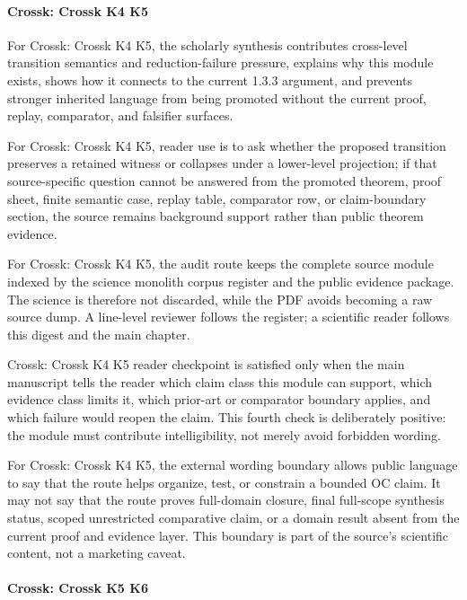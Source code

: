 \paragraph{Crossk: Crossk K4 K5}

For Crossk: Crossk K4 K5, the scholarly synthesis contributes cross-level transition semantics and reduction-failure pressure, explains why this module exists, shows how it connects to the current 1.3.3 argument, and prevents stronger inherited language from being promoted without the current proof, replay, comparator, and falsifier surfaces.


For Crossk: Crossk K4 K5, reader use is to ask whether the proposed transition preserves a retained witness or collapses under a lower-level projection; if that source-specific question cannot be answered from the promoted theorem, proof sheet, finite semantic case, replay table, comparator row, or claim-boundary section, the source remains background support rather than public theorem evidence.


For Crossk: Crossk K4 K5, the audit route keeps the complete source module indexed by the science monolith corpus register and the public evidence package. The science is therefore not discarded, while the PDF avoids becoming a raw source dump. A line-level reviewer follows the register; a scientific reader follows this digest and the main chapter.


Crossk: Crossk K4 K5 reader checkpoint is satisfied only when the main manuscript tells the reader which claim class this module can support, which evidence class limits it, which prior-art or comparator boundary applies, and which failure would reopen the claim. This fourth check is deliberately positive: the module must contribute intelligibility, not merely avoid forbidden wording.


For Crossk: Crossk K4 K5, the external wording boundary allows public language to say that the route helps organize, test, or constrain a bounded OC claim. It may not say that the route proves full-domain closure, final full-scope synthesis status, scoped unrestricted comparative claim, or a domain result absent from the current proof and evidence layer. This boundary is part of the source's scientific content, not a marketing caveat.


\paragraph{Crossk: Crossk K5 K6}

